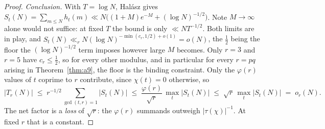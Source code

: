 \documentclass[11pt]{article}
\theoremstyle{definition}
\begin{document}
\begin{proof}
\emph{Conclusion.} With $T=\log N$, Hal\'asz gives
$S_t(N)=\sum_{m\le N}h_t(m)\ll N\bigl((1+M)e^{-M}+(\log N)^{-1/2}\bigr)$. Note $M\to\infty$ alone would not suffice:
at fixed $T$ the bound is only $\ll NT^{-1/2}$. Both limits are in play, and
$S_t(N)\ll_rN(\log N)^{-\min(c_r,1/2)+o(1)}=o(N)$, the $\tfrac12$ being the floor the
$(\log N)^{-1/2}$ term imposes however large $M$ becomes. Only $r=3$ and $r=5$ have $c_r\le\tfrac12$,
so for every other modulus, and in particular for every $r=pq$ arising in Theorem~\ref{thm:a9}, the
floor is the binding constraint. Only the $\varphi(r)$ values of $t$ coprime to $r$
contribute, since $\chi(t)=0$ otherwise, so
\[ |T_r(N)|\;\le\;r^{-1/2}\!\!\sum_{\gcd(t,r)=1}\!\!|S_t(N)|\;\le\;\frac{\varphi(r)}{\sqrt r}\,
   \max_t|S_t(N)|\;\le\;\sqrt r\,\max_t|S_t(N)|\;=\;o_r(N). \]
The net factor is a \emph{loss} of $\sqrt r$: the $\varphi(r)$ summands outweigh
$|\tau(\chi)|^{-1}$. At fixed $r$ that is a constant.
\end{proof}
\end{document}
